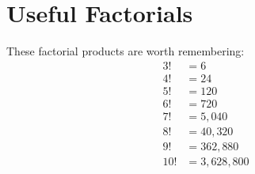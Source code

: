 
\section*{Useful Factorials}
These factorial products are worth remembering:
\begin{align*}
 3! & = 6 \\
 4! & = 24 \\
 5! & = 120 \\
 6! & = 720 \\
 7! & = 5,040 \\
 8! & = 40,320 \\
 9! & = 362,880 \\
10! & = 3,628,800 
\end{align*}